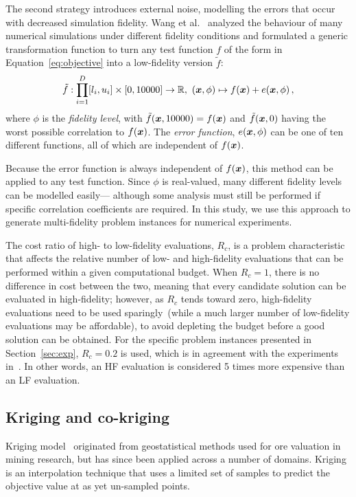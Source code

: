 The second strategy introduces external noise, modelling the errors that occur with decreased simulation fidelity. Wang et al.~\cite{wang2017generic} analyzed the behaviour of many numerical simulations under different fidelity conditions and formulated a generic transformation function to turn any test function $f$ of the form in Equation~\ref{eq:objective} into a low-fidelity version $\tilde f$:
\begin{equation}
\tilde f: \displaystyle\prod^D_{i=1}[l_i,u_i] \times [0,10000] \to \mathbb{R},\ (\V{x},\phi) \mapsto f(\V{x}) + e(\V{x},\phi)\,,\label{eq:error-fn}
\end{equation}
where $\phi$ is the \emph{fidelity level}, with $\tilde f(\boldsymbol{x},10000) = f(\boldsymbol{x})$ and $\tilde f(\boldsymbol{x},0)$ having the worst possible correlation to $f(\boldsymbol{x})$. The \emph{error function}, $e(\boldsymbol{x},\phi)$ can be one of ten different functions, all of which are independent of $f(\boldsymbol{x})$.

Because the error function is always independent of $f(\boldsymbol{x})$, this method can be applied to any test function. Since $\phi$ is real-valued, many different fidelity levels can be modelled easily--- although some analysis must still be performed if specific correlation coefficients are required. In this study, we use this approach to generate multi-fidelity problem instances for numerical experiments. 

The cost ratio of high- to low-fidelity evaluations, $R_c$, is a problem characteristic that affects the relative number of low- and high-fidelity evaluations that can be performed within a given computational budget. When $R_c=1$, there is no difference in cost between the two, meaning that every candidate solution can be evaluated in high-fidelity; however, as $R_c$ tends toward zero, high-fidelity evaluations need to be used sparingly~(while a much larger number of low-fidelity evaluations may be affordable), to avoid depleting the budget before a good solution can be obtained. For the specific problem instances presented in Section~\ref{sec:exp}, $R_c=0.2$ is used, which is in agreement with the experiments in~\cite{lv2021multi}. In other words, an HF evaluation is considered 5 times more expensive than an LF evaluation.

\subsection{Kriging and co-kriging}
Kriging model~\cite{forrester2008engineering} originated from geostatistical methods used for ore valuation in mining research, but has since been applied across a number of domains. Kriging is an interpolation technique that uses a limited set of samples to predict the objective value at as yet un-sampled points.

